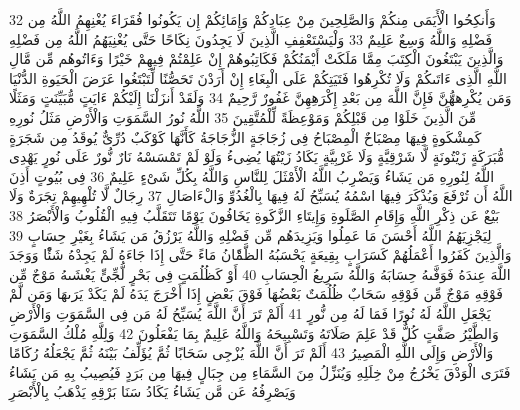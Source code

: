 \documentclass[20pt,a4paper]{article}
\begin{document}
{\tiny\colorbox{cl_aya}{32}} وَأَنكِحُوا الْأَيَمَى مِنكُمْ وَالصَّلِحِينَ مِنْ عِبَادِكُمْ وَإِمَائِكُمْ إِن يَكُونُوا فُقَرَاءَ يُغْنِهِمُ اللَّهُ مِن فَضْلِهِ وَاللَّهُ وَسِعٌ عَلِيمٌ
{\tiny\colorbox{cl_aya}{33}} وَلْيَسْتَعْفِفِ الَّذِينَ لَا يَجِدُونَ نِكَاحًا حَتَّى يُغْنِيَهُمُ اللَّهُ مِن فَضْلِهِ وَالَّذِينَ يَبْتَغُونَ الْكِتَبَ مِمَّا مَلَكَتْ أَيْمَنُكُمْ فَكَاتِبُوهُمْ إِنْ عَلِمْتُمْ فِيهِمْ خَيْرًا وَءَاتُوهُم مِّن مَّالِ اللَّهِ الَّذِى ءَاتَىكُمْ وَلَا تُكْرِهُوا فَتَيَتِكُمْ عَلَى الْبِغَاءِ إِنْ أَرَدْنَ تَحَصُّنًا لِّتَبْتَغُوا عَرَضَ الْحَيَوةِ الدُّنْيَا وَمَن يُكْرِههُّنَّ فَإِنَّ اللَّهَ مِن بَعْدِ إِكْرَهِهِنَّ غَفُورٌ رَّحِيمٌ
{\tiny\colorbox{cl_aya}{34}} وَلَقَدْ أَنزَلْنَا إِلَيْكُمْ ءَايَتٍ مُّبَيِّنَتٍ وَمَثَلًا مِّنَ الَّذِينَ خَلَوْا مِن قَبْلِكُمْ وَمَوْعِظَةً لِّلْمُتَّقِينَ
{\tiny\colorbox{cl_aya}{35}} اللَّهُ نُورُ السَّمَوَتِ وَالْأَرْضِ مَثَلُ نُورِهِ كَمِشْكَوةٍ فِيهَا مِصْبَاحٌ الْمِصْبَاحُ فِى زُجَاجَةٍ الزُّجَاجَةُ كَأَنَّهَا كَوْكَبٌ دُرِّىٌّ يُوقَدُ مِن شَجَرَةٍ مُّبَرَكَةٍ زَيْتُونَةٍ لَّا شَرْقِيَّةٍ وَلَا غَرْبِيَّةٍ يَكَادُ زَيْتُهَا يُضِىءُ وَلَوْ لَمْ تَمْسَسْهُ نَارٌ نُّورٌ عَلَى نُورٍ يَهْدِى اللَّهُ لِنُورِهِ مَن يَشَاءُ وَيَضْرِبُ اللَّهُ الْأَمْثَلَ لِلنَّاسِ وَاللَّهُ بِكُلِّ شَىْءٍ عَلِيمٌ
{\tiny\colorbox{cl_aya}{36}} فِى بُيُوتٍ أَذِنَ اللَّهُ أَن تُرْفَعَ وَيُذْكَرَ فِيهَا اسْمُهُ يُسَبِّحُ لَهُ فِيهَا بِالْغُدُوِّ وَالْءَاصَالِ
{\tiny\colorbox{cl_aya}{37}} رِجَالٌ لَّا تُلْهِيهِمْ تِجَرَةٌ وَلَا بَيْعٌ عَن ذِكْرِ اللَّهِ وَإِقَامِ الصَّلَوةِ وَإِيتَاءِ الزَّكَوةِ يَخَافُونَ يَوْمًا تَتَقَلَّبُ فِيهِ الْقُلُوبُ وَالْأَبْصَرُ
{\tiny\colorbox{cl_aya}{38}} لِيَجْزِيَهُمُ اللَّهُ أَحْسَنَ مَا عَمِلُوا وَيَزِيدَهُم مِّن فَضْلِهِ وَاللَّهُ يَرْزُقُ مَن يَشَاءُ بِغَيْرِ حِسَابٍ
{\tiny\colorbox{cl_aya}{39}} وَالَّذِينَ كَفَرُوا أَعْمَلُهُمْ كَسَرَابٍ بِقِيعَةٍ يَحْسَبُهُ الظَّمَْٔانُ مَاءً حَتَّى إِذَا جَاءَهُ لَمْ يَجِدْهُ شَئًْا وَوَجَدَ اللَّهَ عِندَهُ فَوَفَّىهُ حِسَابَهُ وَاللَّهُ سَرِيعُ الْحِسَابِ
{\tiny\colorbox{cl_aya}{40}} أَوْ كَظُلُمَتٍ فِى بَحْرٍ لُّجِّىٍّ يَغْشَىهُ مَوْجٌ مِّن فَوْقِهِ مَوْجٌ مِّن فَوْقِهِ سَحَابٌ ظُلُمَتٌ بَعْضُهَا فَوْقَ بَعْضٍ إِذَا أَخْرَجَ يَدَهُ لَمْ يَكَدْ يَرَىهَا وَمَن لَّمْ يَجْعَلِ اللَّهُ لَهُ نُورًا فَمَا لَهُ مِن نُّورٍ
{\tiny\colorbox{cl_aya}{41}} أَلَمْ تَرَ أَنَّ اللَّهَ يُسَبِّحُ لَهُ مَن فِى السَّمَوَتِ وَالْأَرْضِ وَالطَّيْرُ صَفَّتٍ كُلٌّ قَدْ عَلِمَ صَلَاتَهُ وَتَسْبِيحَهُ وَاللَّهُ عَلِيمٌ بِمَا يَفْعَلُونَ
{\tiny\colorbox{cl_aya}{42}} وَلِلَّهِ مُلْكُ السَّمَوَتِ وَالْأَرْضِ وَإِلَى اللَّهِ الْمَصِيرُ
{\tiny\colorbox{cl_aya}{43}} أَلَمْ تَرَ أَنَّ اللَّهَ يُزْجِى سَحَابًا ثُمَّ يُؤَلِّفُ بَيْنَهُ ثُمَّ يَجْعَلُهُ رُكَامًا فَتَرَى الْوَدْقَ يَخْرُجُ مِنْ خِلَلِهِ وَيُنَزِّلُ مِنَ السَّمَاءِ مِن جِبَالٍ فِيهَا مِن بَرَدٍ فَيُصِيبُ بِهِ مَن يَشَاءُ وَيَصْرِفُهُ عَن مَّن يَشَاءُ يَكَادُ سَنَا بَرْقِهِ يَذْهَبُ بِالْأَبْصَرِ
\end{document}
